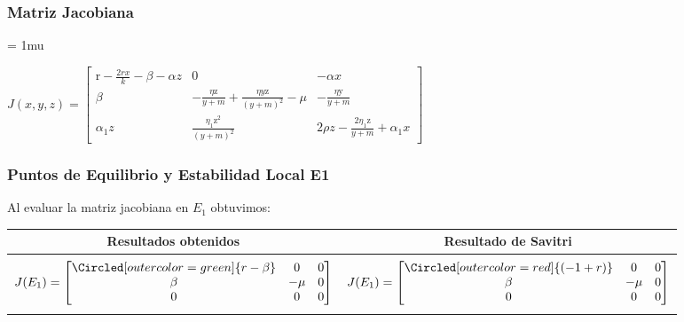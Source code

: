 \documentclass{beamer}
\begin{document}
\begin{frame}
	\frametitle{Matriz Jacobiana}
	\begin{minipage}{10cm}
\setlength{\arraycolsep}{2.5pt}
\medmuskip = 1mu %
		
		
		$	J\left(x, y, z\right)=\left[\begin{array}{ccc}
					\mathrm{r}-\frac{2 r x}{k}-\beta-\alpha z & 0                                                                  & -\alpha x                                           \\
					\beta                                     & -\frac{\eta \mathrm{z}}{y+m}+\frac{\eta y \mathrm{z}}{(y+m)^2}-\mu & -\frac{\eta \mathrm{y}}{y+m}                        \\
					\alpha_1 z                                & \frac{\eta_1 \mathrm{z}^2}{(y+m)^2}                                & 2 \rho z-\frac{2 \eta_1 \mathrm{z}}{y+m}+\alpha_1 x
				\end{array}\right]$
		
	\end{minipage}
\end{frame}

\begin{frame}
	\frametitle{Puntos de Equilibrio y Estabilidad Local E1}
	Al evaluar la matriz jacobiana en $E_1$ obtuvimos:
	\begin{center}
		\begin{tabular}{ c c }
			\toprule
			\textbf{Resultados obtenidos}                        & \textbf{Resultado de Savitri} \\
			\midrule                                                                             \\
			\addlinespace[-2ex]
			$J(E_1) =\label{Characteristic000t} \begin{bmatrix}
			\Circled[outer color=green]{r-\beta} & 0    & 0 \\
			\beta                                & -\mu & 0 \\
			0                                    & 0    & 0
			\end{bmatrix}$ &
			$J(E_1) =\label{Characteristic000f} \begin{bmatrix}
			\Circled[outer color=red]{(-1+ r) } & 0    & 0 \\
			\beta                               & -\mu & 0 \\
			0                                   & 0    & 0
			\end{bmatrix}$   \\
			\addlinespace[1.5ex]
			
			\bottomrule
		\end{tabular}
	\end{center}
	
\end{frame}
\end{document}
